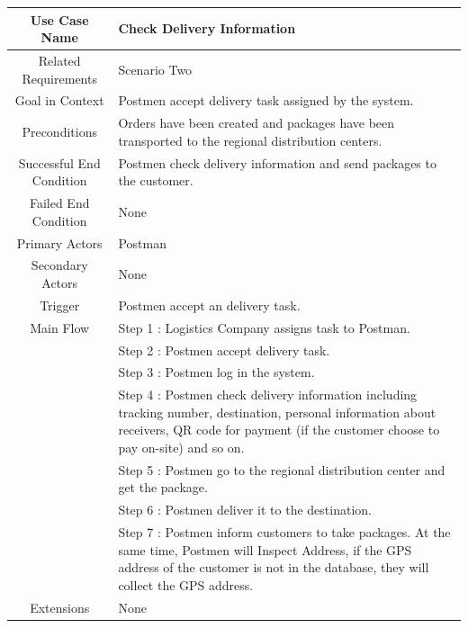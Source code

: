 \documentclass[12pt]{scrreprt}
\begin{document}
\begin{table}
  \centering
  \begin{tabular}{| c | p{11cm} |}
    \hline
    Use Case Name & Check Delivery Information\\
    \hline
    Related Requirements & Scenario Two\\
    \hline
    Goal in Context & Postmen accept delivery task assigned by the system.\\
    \hline
    Preconditions & Orders have been created and packages have been
    transported to the regional distribution centers.\\
    \hline
    Successful End Condition & Postmen check delivery information and send
    packages to the customer.\\
    \hline
    Failed End Condition & None\\
    \hline
    Primary Actors & Postman\\
    \hline
    Secondary Actors & None\\
    \hline
    Trigger & Postmen accept an delivery task.\\
    \hline
    Main Flow & Step 1 : Logistics Company assigns task to Postman.\\
    & Step 2 : Postmen accept delivery task.\\
    & Step 3 : Postmen log in the system.\\
    & Step 4 : Postmen check delivery information including tracking number,
    destination, personal information about receivers, QR code for payment
    (if the customer choose to pay on-site) and so on.\\
    & Step 5 : Postmen go to the regional distribution center and get the
    package.\\
    & Step 6 : Postmen deliver it to the destination.\\
    & Step 7 : Postmen inform customers to take packages. At the same time,
    Postmen will Inspect Address, if the GPS address of  the customer is not
    in the database, they will collect the GPS address.\\
    \hline
    Extensions & None\\
    \hline
  \end{tabular}
\end{table}
\end{document}
